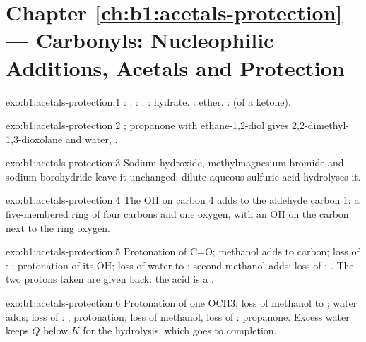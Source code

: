 \section*{Chapter \ref{ch:b1:acetals-protection} --- Carbonyls: Nucleophilic Additions, Acetals and Protection}

\begin{solution}{exo:b1:acetals-protection:1}
: . : .
: hydrate. : ether. :
 (of a ketone).
\end{solution}

\begin{solution}{exo:b1:acetals-protection:2}
; propanone with
ethane-1,2-diol gives 2,2-dimethyl-1,3-dioxolane and water,
.
\end{solution}

\begin{solution}{exo:b1:acetals-protection:3}
Sodium hydroxide, methylmagnesium bromide and sodium borohydride leave it
unchanged; dilute aqueous sulfuric acid hydrolyses it.
\end{solution}

\begin{solution}{exo:b1:acetals-protection:4}
The OH on carbon 4 adds to the aldehyde carbon 1: a five-membered ring of
four carbons and one oxygen, with an OH on the carbon next to the ring
oxygen.
\end{solution}

\begin{solution}{exo:b1:acetals-protection:5}
Protonation of C=O; methanol adds to carbon; loss of : ;
protonation of its OH; loss of water to ; second methanol
adds; loss of : . The two protons taken are given
back: the acid is a .
\end{solution}

\begin{solution}{exo:b1:acetals-protection:6}
Protonation of one OCH3; loss of methanol to ; water adds;
loss of : ; protonation, loss of methanol, loss of :
propanone. Excess water keeps $Q$ below $K$ for the hydrolysis, which goes
to completion.
\end{solution}

